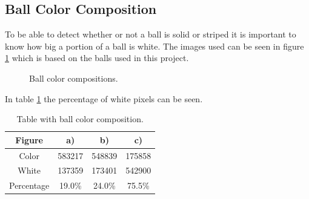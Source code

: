 

\subsection{Ball Color Composition}
To be able to detect whether or not a ball is solid or striped it is important to know how big a portion of a ball is white. The images used can be seen in figure \ref{fig:ballscompo} which is based on the balls used in this project.

\begin{figure}[htpb]
\centering
{}
\quad
{}
\quad
{}

\caption{Ball color compositions.}
\label{fig:ballscompo}
\end{figure}

In table \ref{fig:ballscompotable} the percentage of white pixels can be seen.

\begin{table}[htpb]
\centering
\begin{tabular}{|c|c|c|c|}
	\hline Figure & a) & b) & c) \\ 
	\hline Color & 583217 & 548839 & 175858 \\ 
	\hline White & 137359 & 173401 & 542900 \\ 
	\hline Percentage & 19.0\% & 24.0\% & 75.5\% \\ 
	\hline
\end{tabular}
\caption{Table with ball color composition.}
\label{fig:ballscompotable}
\end{table}
